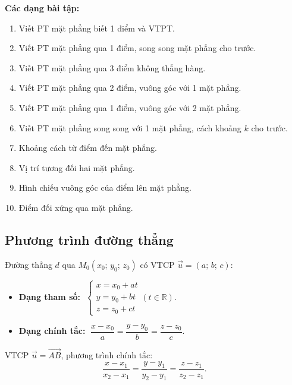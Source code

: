 \documentclass[12pt,a4paper]{article}
\begin{document}
\medskip\noindent\textbf{Các dạng bài tập:}
\begin{enumerate}[label=\textbf{Dạng \arabic*:}, leftmargin=*, align=left]
  \item Viết PT mặt phẳng biết 1 điểm và VTPT.
  \item Viết PT mặt phẳng qua 1 điểm, song song mặt phẳng cho trước.
  \item Viết PT mặt phẳng qua 3 điểm không thẳng hàng.
  \item Viết PT mặt phẳng qua 2 điểm, vuông góc với 1 mặt phẳng.
  \item Viết PT mặt phẳng qua 1 điểm, vuông góc với 2 mặt phẳng.
  \item Viết PT mặt phẳng song song với 1 mặt phẳng, cách khoảng $k$ cho trước.
  \item Khoảng cách từ điểm đến mặt phẳng.
  \item Vị trí tương đối hai mặt phẳng.
  \item Hình chiếu vuông góc của điểm lên mặt phẳng.
  \item Điểm đối xứng qua mặt phẳng.
\end{enumerate}

\subsection{Phương trình đường thẳng}

\begin{dinhnghia}
  Đường thẳng $d$ qua $M_0(x_0;\, y_0;\, z_0)$ có VTCP $\vec{u} = (a;\, b;\, c)$:
  \begin{itemize}
    \item \textbf{Dạng tham số:}
      $\;\begin{cases} x = x_0 + at \\ y = y_0 + bt \\ z = z_0 + ct \end{cases}$\quad $(t \in \mathbb{R})$.
    \item \textbf{Dạng chính tắc:}
      $\;\dfrac{x - x_0}{a} = \dfrac{y - y_0}{b} = \dfrac{z - z_0}{c}$.
  \end{itemize}
\end{dinhnghia}

\begin{congthuc}[title={Đường thẳng qua hai điểm $A(x_1;\, y_1;\, z_1)$ và $B(x_2;\, y_2;\, z_2)$}]
  VTCP $\vec{u} = \overrightarrow{AB}$, phương trình chính tắc:
  \[
    \frac{x - x_1}{x_2 - x_1} = \frac{y - y_1}{y_2 - y_1} = \frac{z - z_1}{z_2 - z_1}.
  \]
\end{congthuc}
\end{document}
